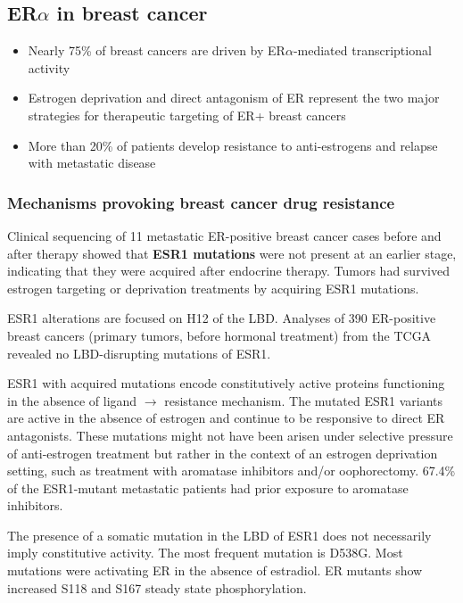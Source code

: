 \subsection{ER$\alpha$ in breast cancer}

\begin{itemize}
\tightlist
\item
  Nearly 75\% of breast cancers are driven by ER$\alpha$-mediated transcriptional activity
\item
  Estrogen deprivation and direct antagonism of ER represent the two major strategies for therapeutic targeting of ER+ breast cancers
\item
  More than 20\% of patients develop resistance to anti-estrogens and relapse with metastatic disease
\end{itemize}

\hypertarget{mechanisms-provoking-breast-cancer-drug-resistance}{%
\subsubsection{Mechanisms provoking breast cancer drug resistance}\label{mechanisms-provoking-breast-cancer-drug-resistance}}

Clinical sequencing of 11 metastatic ER-positive breast cancer cases before and after therapy showed that \textbf{ESR1 mutations} were not present at an earlier stage, indicating that they were acquired after endocrine therapy. Tumors had survived estrogen targeting or deprivation treatments by acquiring ESR1 mutations.

ESR1 alterations are focused on H12 of the LBD. Analyses of 390 ER-positive breast cancers (primary tumors, before hormonal treatment) from the TCGA revealed no LBD-disrupting mutations of ESR1.

ESR1 with acquired mutations encode constitutively active proteins functioning in the absence of ligand $\rightarrow$ resistance mechanism. The mutated ESR1 variants are active in the absence of estrogen and continue to be responsive to direct ER antagonists. These mutations might not have been arisen under selective pressure of anti-estrogen treatment but rather in the context of an estrogen deprivation setting, such as treatment with aromatase inhibitors and/or oophorectomy. 67.4\% of the ESR1-mutant metastatic patients had prior exposure to aromatase inhibitors.

The presence of a somatic mutation in the LBD of ESR1 does not necessarily imply constitutive activity. The most frequent mutation is D538G. Most mutations were activating ER in the absence of estradiol. ER mutants show increased S118 and S167 steady state phosphorylation.

